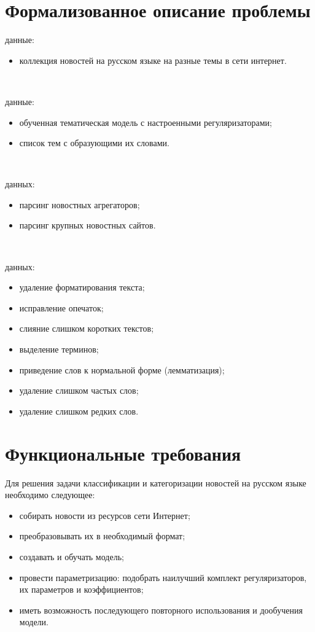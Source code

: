 \section{Формализованное описание проблемы}

 данные:

\begin{itemize}
    \item коллекция новостей на русском языке на разные темы в сети интернет.
\end{itemize}

~\

 данные:

\begin{itemize}
    \item обученная тематическая модель с настроенными регуляризаторами;
    \item список тем с образующими их словами.
\end{itemize}

~\

 данных:

\begin{itemize}
    \item парсинг новостных агрегаторов;
    \item парсинг крупных новостных сайтов.
\end{itemize}

~\

 данных:

\begin{itemize}
    \item удаление форматирования текста;
    \item исправление опечаток;
    \item слияние слишком коротких текстов;
    \item выделение терминов;
    \item приведение слов к нормальной форме (лемматизация);
    \item удаление слишком частых слов;
    \item удаление слишком редких слов.
\end{itemize}

%
\section{Функциональные требования}

Для решения задачи классификации и категоризации новостей на русском языке необходимо следующее: 

\begin{itemize}
    \item собирать новости из ресурсов сети Интернет;
    \item преобразовывать их в необходимый формат;
    \item создавать и обучать модель;
    \item провести параметризацию: подобрать наилучший комплект регуляризаторов, их параметров и коэффициентов;
    \item иметь возможность последующего повторного использования и дообучения модели.
\end{itemize}
